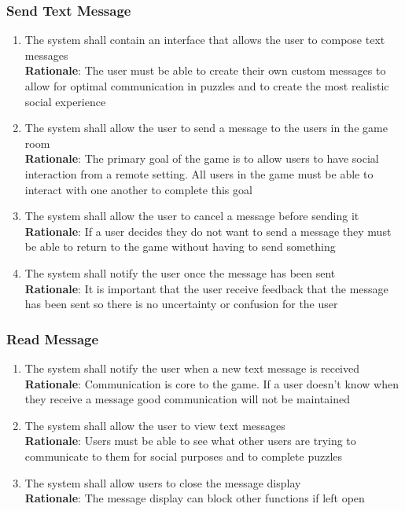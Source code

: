 \documentclass[12pt]{article}
\begin{document}
\subsubsection{Send Text Message}
    \begin{enumerate}[label=SM\arabic*., series=SendMessage]
        \item The system shall contain an interface that allows the user to compose text messages\\
        \textbf{Rationale}: The user must be able to create their own custom messages to allow for optimal communication in puzzles and to create the most realistic social experience
        \item The system shall allow the user to send a message to the users in the game room\\
        \textbf{Rationale}: The primary goal of the game is to allow users to have social interaction from a remote setting. All users in the game must be able to interact with one another to complete this goal
        \item The system shall allow the user to cancel a message before sending it\\
        \textbf{Rationale}: If a user decides they do not want to send a message they must be able to return to the game without having to send something
        \item The system shall notify the user once the message has been sent\\
        \textbf{Rationale}: It is important that the user receive feedback that the message has been sent so there is no uncertainty or confusion for the user
    \end{enumerate}
\subsubsection{Read Message}
    \begin{enumerate}[label=RM\arabic*., series=ReadMessage]
        \item The system shall notify the user when a new text message is received\\
        \textbf{Rationale}: Communication is core to the game. If a user doesn't know when they receive a message good communication will not be maintained
        \item The system shall allow the user to view text messages\\
        \textbf{Rationale}: Users must be able to see what other users are trying to communicate to them for social purposes and to complete puzzles
        \item The system shall allow users to close the message display\\
        \textbf{Rationale}: The message display can block other functions if left open
    \end{enumerate}
\end{document}
